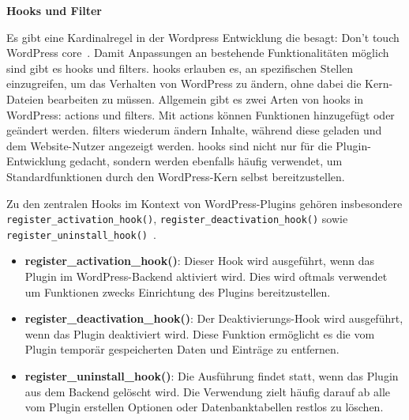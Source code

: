 \newpage
\textbf{Hooks und Filter}

Es gibt eine Kardinalregel in der Wordpress Entwicklung die besagt: Don’t touch WordPress core~\cite{wordpress2024Intro}.
Damit Anpassungen an bestehende Funktionalitäten möglich sind gibt es \glspl{hook} und \glspl{filter}.
\glspl{hook} erlauben es, an spezifischen Stellen einzugreifen, um das Verhalten von WordPress zu ändern, ohne dabei die Kern-Dateien bearbeiten zu müssen.
Allgemein gibt es zwei Arten von \glspl{hook} in WordPress: \glspl{action} und \glspl{filter}.
Mit \glspl{action} können Funktionen hinzugefügt oder geändert werden.
\glspl{filter} wiederum ändern Inhalte, während diese geladen und dem Website-Nutzer angezeigt werden.
\glspl{hook} sind nicht nur für die Plugin-Entwicklung gedacht, sondern werden ebenfalls häufig verwendet, um Standardfunktionen durch den WordPress-Kern selbst bereitzustellen.

Zu den zentralen Hooks im Kontext von WordPress-Plugins gehören insbesondere \texttt{register\_activation\_hook()}, \texttt{register\_deactivation\_hook()} sowie \\ \texttt{register\_uninstall\_hook()}~\cite{wordpress2024ActionsHooks}.

\begin{itemize}
 \item \textbf{register\_activation\_hook()}: Dieser Hook wird ausgeführt, wenn das Plugin im WordPress-Backend aktiviert wird. Dies wird oftmals verwendet um Funktionen zwecks Einrichtung des Plugins bereitzustellen.
 \item \textbf{register\_deactivation\_hook()}: Der Deaktivierungs-Hook wird ausgeführt, wenn das Plugin deaktiviert wird. Diese Funktion ermöglicht es die vom Plugin temporär gespeicherten Daten und Einträge zu entfernen.
 \item \textbf{register\_uninstall\_hook()}: Die Ausführung findet statt, wenn das Plugin aus dem Backend gelöscht wird. Die Verwendung zielt häufig darauf ab alle vom Plugin erstellen Optionen oder Datenbanktabellen restlos zu löschen.
\end{itemize}






